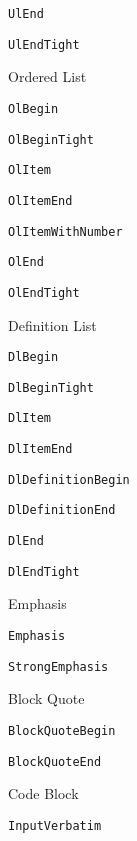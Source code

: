 \documentclass[
  digital,     %
  oneside,     %
  nosansbold,  %
  nocolorbold, %
  lof,         %
  lot,         %
]{fithesis4}
\begin{document}
\begin{figure}
\begin{multicols}{2}
\begin{compactenum}
\begin{compactenum}
        \item \texttt{UlEnd}
        \item \texttt{UlEndTight}
      \end{compactenum}
      \item Ordered List
      \begin{compactenum}
        \item \texttt{OlBegin}
        \item \texttt{OlBeginTight}
        \item \texttt{OlItem}
        \item \texttt{OlItemEnd}
        \item \texttt{OlItemWithNumber}
        \item \texttt{OlEnd}
        \item \texttt{OlEndTight}
      \end{compactenum}
      \item Definition List
      \begin{compactenum}
        \item \texttt{DlBegin}
        \item \texttt{DlBeginTight}
        \item \texttt{DlItem}
        \item \texttt{DlItemEnd}
        \item \texttt{DlDefinitionBegin}
        \item \texttt{DlDefinitionEnd}
        \item \texttt{DlEnd}
        \item \texttt{DlEndTight}
      \end{compactenum}
      \item Emphasis
      \begin{compactenum}
        \item \texttt{Emphasis}
        \item \texttt{StrongEmphasis}
      \end{compactenum}
      \item Block Quote
      \begin{compactenum}
        \item \texttt{BlockQuoteBegin}
        \item \texttt{BlockQuoteEnd}
      \end{compactenum}
      \item Code Block
      \begin{compactenum}
        \item \texttt{InputVerbatim}

\end{compactenum}
\end{compactenum}
\end{multicols}
\end{figure}
\end{document}
